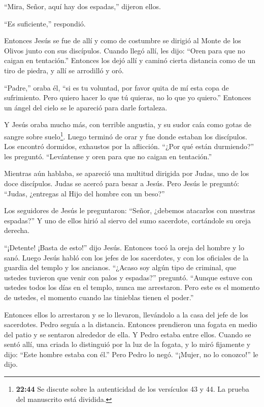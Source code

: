  ``Mira, Señor, aquí hay dos espadas,'' dijeron ellos.

``Es suficiente,'' respondió.

 Entonces Jesús se fue de allí y como de costumbre se
dirigió al Monte de los Olivos junto con sus discípulos. 
Cuando llegó allí, les dijo: ``Oren para que no caigan en tentación.''
 Entonces los dejó allí y caminó cierta distancia como de
un tiro de piedra, y allí se arrodilló y oró.

 ``Padre,'' oraba él, ``si es tu voluntad, por favor quita
de mí esta copa de sufrimiento. Pero quiero hacer lo que tú quieras, no
lo que yo quiero.''  Entonces un ángel del cielo se le
apareció para darle fortaleza.

 Y Jesús oraba mucho más, con terrible angustia, y su sudor
caía como gotas de sangre sobre suelo\footnote{\textbf{22:44} Se discute
  sobre la autenticidad de los versículos 43 y 44. La prueba del
  manuscrito está dividida.}.  Luego terminó de orar y fue
donde estaban los discípulos. Los encontró dormidos, exhaustos por la
aflicción.  ``¿Por qué están durmiendo?'' les preguntó.
``Levántense y oren para que no caigan en tentación.''

 Mientras aún hablaba, se apareció una multitud dirigida
por Judas, uno de los doce discípulos. Judas se acercó para besar a
Jesús.  Pero Jesús le preguntó: ``Judas, ¿entregas al Hijo
del hombre con un beso?''

 Los seguidores de Jesús le preguntaron: ``Señor, ¿debemos
atacarlos con nuestras espadas?''  Y uno de ellos hirió al
siervo del sumo sacerdote, cortándole su oreja derecha.

 ``¡Detente! ¡Basta de esto!'' dijo Jesús. Entonces tocó la
oreja del hombre y lo sanó.  Luego Jesús habló con los
jefes de los sacerdotes, y con los oficiales de la guardia del templo y
los ancianos. ``¿Acaso soy algún tipo de criminal, que ustedes tuvieron
que venir con palos y espadas?'' preguntó.  ``Aunque estuve
con ustedes todos los días en el templo, nunca me arrestaron. Pero este
es el momento de ustedes, el momento cuando las tinieblas tienen el
poder.''

 Entonces ellos lo arrestaron y se lo llevaron, llevándolo
a la casa del jefe de los sacerdotes. Pedro seguía a la distancia.
 Entonces prendieron una fogata en medio del patio y se
sentaron alrededor de ella. Y Pedro estaba entre ellos. 
Cuando se sentó allí, una criada lo distinguió por la luz de la fogata,
y lo miró fijamente y dijo:  ``Este hombre estaba con él.''
Pero Pedro lo negó. ``¡Mujer, no lo conozco!'' le dijo.

